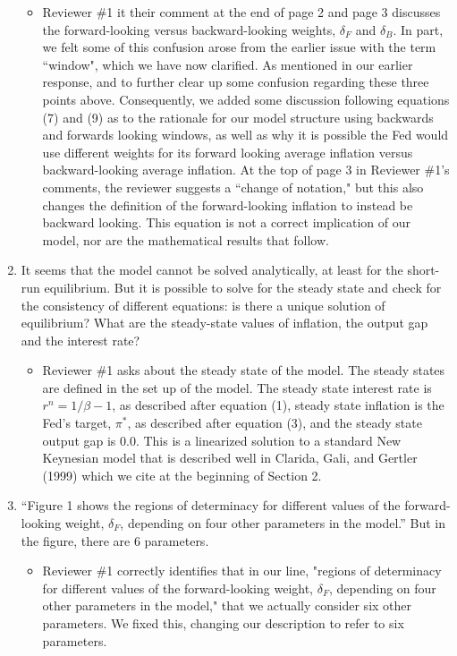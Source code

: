 \documentclass[english,authoryear,12pt]{elsarticle}
\begin{document}
\begin{enumerate}
	\begin{itemize}
		\item Reviewer \#1 it their comment at the end of page 2 and page 3 discusses the forward-looking versus backward-looking weights, $\delta_F$ and $\delta_B$. In part, we felt some of this confusion arose from the earlier issue with the term ``window", which we have now clarified. As mentioned in our earlier response, and to further clear up some confusion regarding these three points above. Consequently, we added some discussion following equations (7) and (9) as to the rationale for our model structure using backwards and forwards looking windows, as well as why it is possible the Fed would use different weights for its forward looking average inflation versus backward-looking average inflation. At the top of page 3 in Reviewer \#1's comments, the reviewer suggests a ``change of notation," but this also changes the definition of the forward-looking inflation to instead be backward looking. This equation is not a correct implication of our model, nor are the mathematical results that follow.
	\end{itemize}
	\item It seems that the model cannot be solved analytically, at least for the short-run equilibrium. But it is possible to solve for the steady state and check for the consistency of different equations: is there a unique solution of equilibrium? What are the steady-state values of inflation, the output gap and the interest rate?
	\begin{itemize}
		\item Reviewer \#1 asks about the steady state of the model. The steady states are defined in the set up of the model. The steady state interest rate is $r^n = 1/\beta - 1$, as described after equation (1), steady state inflation is the Fed's target, $\pi^*$, as described after equation (3), and the steady state output gap is 0.0. This is a linearized solution to a standard New Keynesian model that is described well in Clarida, Gali, and Gertler (1999) which we cite at the beginning of Section 2.
	\end{itemize}
	\item “Figure 1 shows the regions of determinacy for different values of the forward-looking weight, $\delta_F$, depending on four other parameters in the model.” But in the figure, there are 6 parameters.
	\begin{itemize}
		\item Reviewer \#1 correctly identifies that in our line, "regions of determinacy for different values of the forward-looking weight, $\delta_F$, depending on four other parameters in the model," that we actually consider six other parameters. We fixed this, changing our description to refer to six parameters.

\end{itemize}
\end{enumerate}
\end{document}
